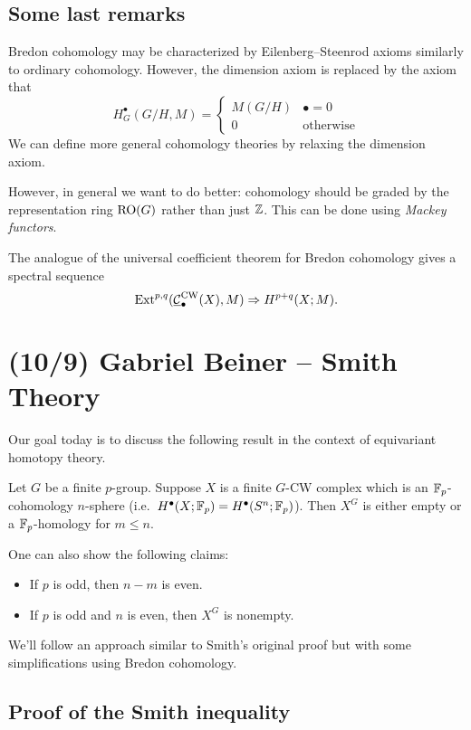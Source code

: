 \documentclass{article}
\begin{document}
\subsection{Some last remarks}

Bredon cohomology may be characterized by Eilenberg--Steenrod axioms similarly to ordinary cohomology.
However, the dimension axiom is replaced by the axiom that 
\[
  H^\bullet_G(G/H, M) = \begin{cases}
    M(G/H) & \textrm{$\bullet = 0$} \\
    0 & \textrm{otherwise}
  \end{cases}
\]
We can define more general cohomology theories by relaxing the dimension axiom.

However, in general we want to do better: cohomology should be graded by the representation ring $\operatorname{RO}(G)$ rather than just $\mathbb{Z}$.
This can be done using \emph{Mackey functors}.

The analogue of the universal coefficient theorem for Bredon cohomology gives a spectral sequence
\[
  \operatorname{Ext}^{p,q}(\underline{\mathcal{C}}_\bullet^{\textrm{CW}}(X), M) \Rightarrow H^{p+q}(X; M).
\]

\section{(10/9) Gabriel Beiner -- Smith Theory}

Our goal today is to discuss the following result in the context of equivariant homotopy theory.

\begin{thm}
  Let $G$ be a finite $p$-group.
  Suppose $X$ is a finite $G$-CW complex which is an $\mathbb{F}_p$-cohomology $n$-sphere (i.e.\ $H^\bullet(X; \mathbb{F}_p) = H^\bullet(S^n; \mathbb{F}_p)$).
  Then $X^G$ is either empty or a $\mathbb{F}_p$-homology for $m \leq n$.

\end{thm}

One can also show the following claims:
\begin{itemize}
  \item If $p$ is odd, then $n - m$ is even.
  \item If $p$ is odd and $n$ is even, then $X^G$ is nonempty.
\end{itemize}

We'll follow an approach similar to Smith's original proof but with some simplifications using Bredon cohomology.

\subsection{Proof of the Smith inequality}
\end{document}
